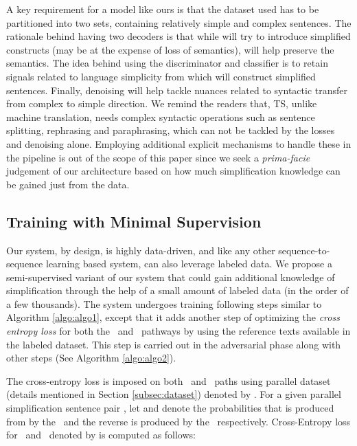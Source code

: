 \documentclass[11pt,a4paper]{article}
\begin{document}
A key requirement for a model like ours is that the dataset used has to be partitioned into two sets, containing relatively simple and complex sentences. The rationale behind having two decoders is that while  will try to introduce simplified constructs (may be at the expense of loss of semantics),  will help preserve the semantics. The idea behind using the discriminator and classifier is to retain signals related to language simplicity from which  will construct simplified sentences. Finally, denoising will help tackle nuances related to syntactic transfer from complex to simple direction. We remind the readers that, TS, unlike machine translation, needs complex syntactic operations such as sentence splitting, rephrasing and paraphrasing, which can not be tackled by the losses and denoising alone. Employing additional explicit mechanisms to handle these in the pipeline is out of the scope of this paper since we seek a \textit{prima-facie} judgement of our architecture based on how much simplification knowledge can be gained just from the data.
\subsection{Training with Minimal Supervision}
\label{sec:semisup}
Our system, by design, is highly data-driven, and like any other sequence-to-sequence learning based system, can also leverage labeled data. We propose a semi-supervised variant of our system that could gain additional knowledge of simplification through the help of a small amount of labeled data (in the order of a few thousands). The system undergoes training following steps similar to Algorithm \ref{algo:algo1}, except that it adds another step of optimizing the \textit{cross entropy loss} for both the \simplf\ and \compl\ pathways by using the reference texts available in the labeled dataset. This step is carried out in the adversarial phase along with other steps (See Algorithm \ref{algo:algo2}).


The cross-entropy loss is imposed on both \simplf\ and \compl\ paths using parallel dataset (details mentioned in Section \ref{subsec:dataset}) denoted by .
For a given parallel simplification sentence pair ,
let  and  denote the probabilities that  is produced from   by the \simplf\ and the reverse is produced by the \compl\ respectively. Cross-Entropy loss for \simplf\ and \compl\ denoted by  is computed as follows:
\end{document}
